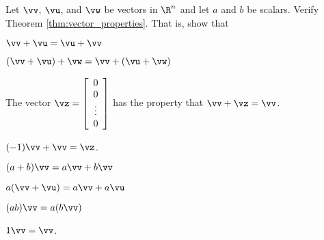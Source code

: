 \item Let $\vv$, $\vu$, and $\vw$ be vectors in $\R^n$ and let $a$ and $b$ be scalars. Verify Theorem \ref{thm:vector_properties}. That is, show that 
	\ba
	\item $\vv + \vu = \vu + \vv$
	\item $(\vv + \vu) + \vw = \vv + (\vu + \vw)$
	\item The vector $\vz = \left[ \begin{array}{c} 0 \\ 0 \\ \vdots \\ 0 \end{array} \right]$ has the property that $\vv + \vz = \vv$. 
	\item  $(-1)\vv + \vv = \vz$. 
	\item $(a+b) \vv = a\vv + b\vv$
	\item $a(\vv + \vu) = a\vv + a\vu$
	\item $(ab) \vv = a(b\vv)$
	\item $1 \vv = \vv$.
	\ea


